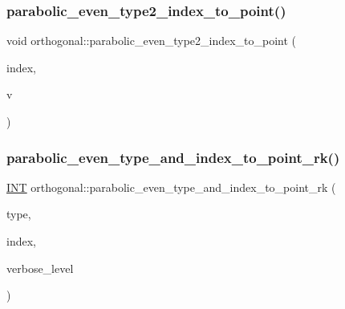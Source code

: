 \mbox{\label{classorthogonal_ac00a073ffe018536d0b07841b405533a}} 
\subsubsection{\texorpdfstring{parabolic\+\_\+even\+\_\+type2\+\_\+index\+\_\+to\+\_\+point()}{parabolic\_even\_type2\_index\_to\_point()}}
{\footnotesize\ttfamily void orthogonal\+::parabolic\+\_\+even\+\_\+type2\+\_\+index\+\_\+to\+\_\+point (\begin{DoxyParamCaption}\item[{\mbox{\hyperlink{galois_8h_a09fddde158a3a20bd2dcadb609de11dc}{I\+NT}}}]{index,  }\item[{\mbox{\hyperlink{galois_8h_a09fddde158a3a20bd2dcadb609de11dc}{I\+NT}} $\ast$}]{v }\end{DoxyParamCaption})}

\mbox{\label{classorthogonal_af43894039e8c5a8039f52b93dfa3ff77}} 
\subsubsection{\texorpdfstring{parabolic\+\_\+even\+\_\+type\+\_\+and\+\_\+index\+\_\+to\+\_\+point\+\_\+rk()}{parabolic\_even\_type\_and\_index\_to\_point\_rk()}}
{\footnotesize\ttfamily \mbox{\hyperlink{galois_8h_a09fddde158a3a20bd2dcadb609de11dc}{I\+NT}} orthogonal\+::parabolic\+\_\+even\+\_\+type\+\_\+and\+\_\+index\+\_\+to\+\_\+point\+\_\+rk (\begin{DoxyParamCaption}\item[{\mbox{\hyperlink{galois_8h_a09fddde158a3a20bd2dcadb609de11dc}{I\+NT}}}]{type,  }\item[{\mbox{\hyperlink{galois_8h_a09fddde158a3a20bd2dcadb609de11dc}{I\+NT}}}]{index,  }\item[{\mbox{\hyperlink{galois_8h_a09fddde158a3a20bd2dcadb609de11dc}{I\+NT}}}]{verbose\+\_\+level }\end{DoxyParamCaption})}

